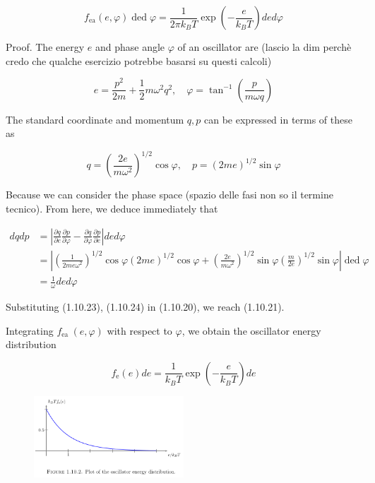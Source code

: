 \documentclass{article}
\begin{document}
\begin{equation*}
f_{\mathrm{ea}}(e, \varphi) \operatorname{ded} \varphi=\frac{1}{2 \pi k_{B} T} \exp \left(-\frac{e}{k_{B} T}\right) d e d \varphi \tag{1.10.21}
\end{equation*}
 

Proof. The energy $e$ and phase angle $\varphi$ of an oscillator are (lascio la dim perchè credo che qualche esercizio potrebbe basarsi su questi calcoli)
 
\begin{equation*}
e=\frac{p^{2}}{2 m}+\frac{1}{2} m \omega^{2} q^{2}, \quad \varphi=\tan ^{-1}\left(\frac{p}{m \omega q}\right) \tag{1.10.22}
\end{equation*}
 

The standard coordinate and momentum $q, p$ can be expressed in terms of these as
 
\begin{equation*}
q=\left(\frac{2 e}{m \omega^{2}}\right)^{1 / 2} \cos \varphi, \quad p=(2 m e)^{1 / 2} \sin \varphi \tag{1.10.23}
\end{equation*}
 
Because we can consider the phase space (spazio delle fasi non so il termine tecnico).
From here, we deduce immediately that
 
\begin{align*}
d q d p & =\left|\frac{\partial q}{\partial e} \frac{\partial p}{\partial \varphi}-\frac{\partial q}{\partial \varphi} \frac{\partial p}{\partial e}\right| d e d \varphi  \tag{1.10.24}\\
& =\left|\left(\frac{1}{2 m e \omega^{2}}\right)^{1 / 2} \cos \varphi(2 m e)^{1 / 2} \cos \varphi+\left(\frac{2 e}{m \omega^{2}}\right)^{1 / 2} \sin \varphi\left(\frac{m}{2 e}\right)^{1 / 2} \sin \varphi\right| \operatorname{ded} \varphi \\
& =\frac{1}{\omega} d e d \varphi
\end{align*}
 

Substituting (1.10.23), (1.10.24) in (1.10.20), we reach (1.10.21).

Integrating $f_{\text {ea }}(e, \varphi)$ with respect to $\varphi$, we obtain the oscillator energy distribution
 
\begin{equation*}
f_{\mathrm{e}}(e) d e=\frac{1}{k_{B} T} \exp \left(-\frac{e}{k_{B} T}\right) d e \tag{1.10.25}
\end{equation*}
 

\begin{figure}[h!]
    \centering
    \includegraphics[width=0.5\textwidth]{pictures_1/fig 1.10.2.png}
    \label{fig:1.9.1}
\end{figure}
\end{document}
